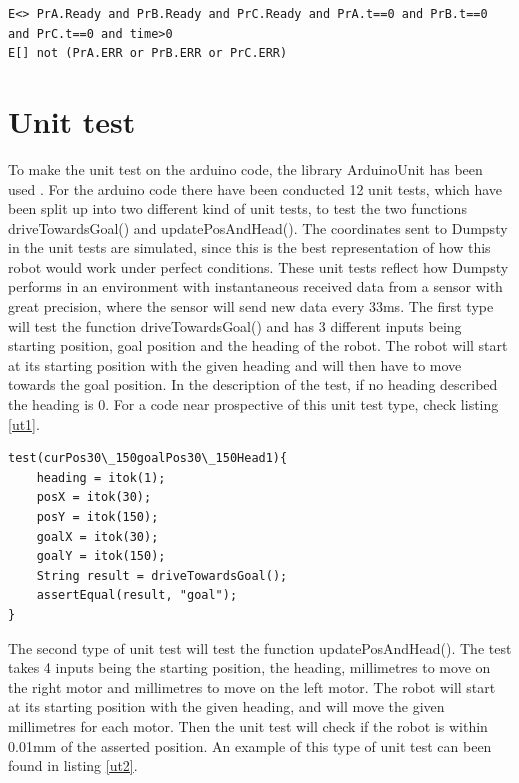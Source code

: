 \begin{lstlisting}[caption={Queries for UPPAAL}, label={Queries}]
E<> PrA.Ready and PrB.Ready and PrC.Ready and PrA.t==0 and PrB.t==0 and PrC.t==0 and time>0
E[] not (PrA.ERR or PrB.ERR or PrC.ERR)
\end{lstlisting}

\section{Unit test}
\label{sec:Unit test}
To make the unit test on the arduino code, the library ArduinoUnit has been used \citep{au}. For the arduino code there have been conducted 12 unit tests, which have been split up into two different kind of unit tests, to test the two functions driveTowardsGoal() and updatePosAndHead(). \newline
The coordinates sent to Dumpsty in the unit tests are simulated, since this is the best representation of how this robot would work under perfect conditions. These unit tests reflect how Dumpsty performs in an environment with instantaneous received data from a sensor with great precision, where the sensor will send new data every 33ms. 
The first type will test the function driveTowardsGoal() and has 3 different inputs being starting position, goal position and the heading of the robot. The robot will start at its starting position with the given heading and will then have to move towards the goal position. In the description of the test, if no heading described the heading is 0. For a code near prospective of this unit test type, check listing \ref{ut1}.

\begin{lstlisting}[caption={First type of Unit test}, label={ut1}]
test(curPos30\_150goalPos30\_150Head1){
	heading = itok(1);
	posX = itok(30);
	posY = itok(150);
	goalX = itok(30);
	goalY = itok(150);
	String result = driveTowardsGoal();
	assertEqual(result, "goal");
}
\end{lstlisting}

The second type of unit test will test the function updatePosAndHead(). The test takes 4 inputs being the starting position, the heading, millimetres to move on the right motor and millimetres to move on the left motor. The robot will start at its starting position with the given heading, and will move the given millimetres for each motor. Then the unit test will check if the robot is within 0.01mm of the asserted position.  An example of this type of unit test can been found in listing \ref{ut2}.

